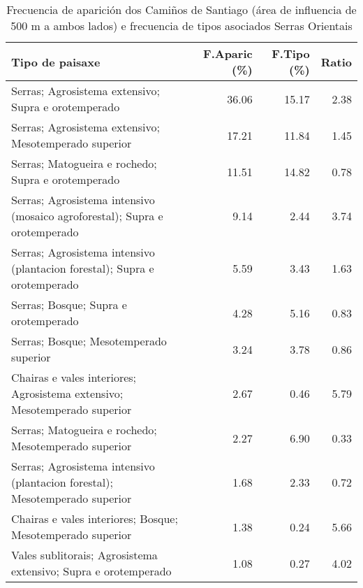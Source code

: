 \begin{table}[p]
\centering
\caption{Frecuencia de aparición dos Camiños de Santiago (área de influencia de 500 m a ambos lados) e frecuencia de tipos asociados Serras Orientais} 
\label{vcamino5}
\begin{tabular}{lrrr}
  \hline
Tipo de paisaxe & F.Aparic (\%) & F.Tipo (\%) & Ratio \\ 
  \hline
Serras; Agrosistema extensivo; Supra e orotemperado & 36.06 & 15.17 & 2.38 \\ 
  Serras; Agrosistema extensivo; Mesotemperado superior & 17.21 & 11.84 & 1.45 \\ 
  Serras; Matogueira e rochedo; Supra e orotemperado & 11.51 & 14.82 & 0.78 \\ 
  Serras; Agrosistema intensivo (mosaico agroforestal); Supra e orotemperado & 9.14 & 2.44 & 3.74 \\ 
  Serras; Agrosistema intensivo (plantacion forestal); Supra e orotemperado & 5.59 & 3.43 & 1.63 \\ 
  Serras; Bosque; Supra e orotemperado & 4.28 & 5.16 & 0.83 \\ 
  Serras; Bosque; Mesotemperado superior & 3.24 & 3.78 & 0.86 \\ 
  Chairas e vales interiores; Agrosistema extensivo; Mesotemperado superior & 2.67 & 0.46 & 5.79 \\ 
  Serras; Matogueira e rochedo; Mesotemperado superior & 2.27 & 6.90 & 0.33 \\ 
  Serras; Agrosistema intensivo (plantacion forestal); Mesotemperado superior & 1.68 & 2.33 & 0.72 \\ 
  Chairas e vales interiores; Bosque; Mesotemperado superior & 1.38 & 0.24 & 5.66 \\ 
  Vales sublitorais; Agrosistema extensivo; Supra e orotemperado & 1.08 & 0.27 & 4.02 \\ 
   \hline
\end{tabular}
\end{table}
